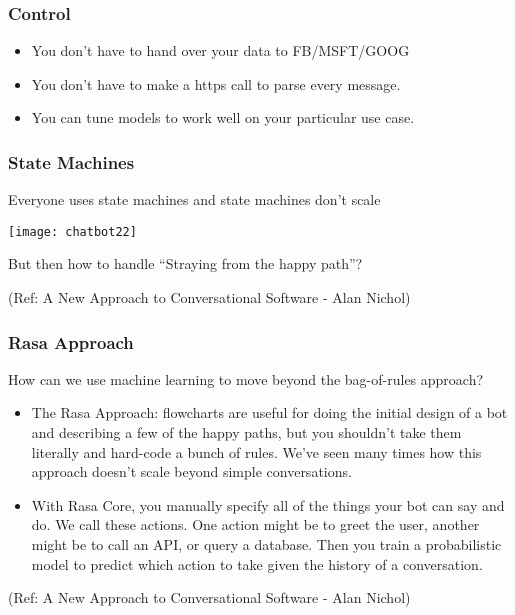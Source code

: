  \begin{frame}[fragile]\frametitle{Control}
\begin{itemize}
\item You don't have to hand over your data to FB/MSFT/GOOG
\item You don't have to make a https call to parse every message.
\item You can tune models to work well on your particular use case.
\end{itemize}
\end{frame}


 \begin{frame}[fragile]\frametitle{State Machines}
Everyone uses state machines and state machines don't scale


\begin{center}
\texttt{[image: chatbot22]}

\end{center}

But then how to handle ``Straying from the happy path''?

{\tiny (Ref: A New Approach to Conversational Software - Alan Nichol)}
\end{frame}

 \begin{frame}[fragile]\frametitle{Rasa Approach}
 
 How can we use machine learning to move beyond the bag-of-rules approach?
 
\begin{itemize}
\item The Rasa Approach: flowcharts are useful for doing the initial design of a bot and describing a few of the happy paths, but you shouldn't take them literally and hard-code a bunch of rules. We've seen many times how this approach doesn't scale beyond simple conversations.
\item With Rasa Core, you manually specify all of the things your bot can say and do. We call these actions. One action might be to greet the user, another might be to call an API, or query a database. Then you train a probabilistic model to predict which action to take given the history of a conversation.
\end{itemize}

{\tiny (Ref: A New Approach to Conversational Software - Alan Nichol)}


\end{frame}

